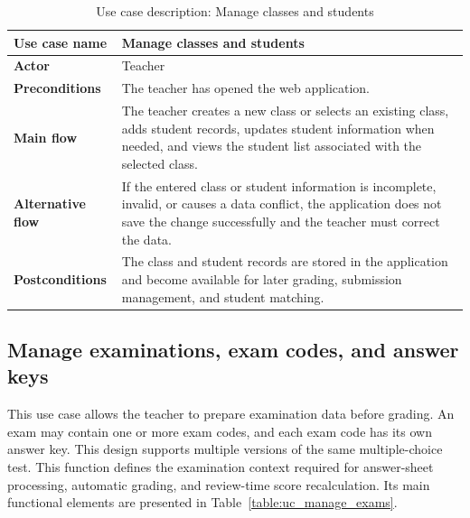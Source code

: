 \documentclass[../Main.tex]{subfiles}
\begin{document}
\begin{table}[H]
    \centering
    \caption{Use case description: Manage classes and students}
    \label{table:uc_manage_students}
    \renewcommand{\arraystretch}{1.25}
    \begin{tabular}{|p{}|p{}|}
        \hline
        \textbf{Use case name} & Manage classes and students \\
        \hline
        \textbf{Actor} & Teacher \\
        \hline
        \textbf{Preconditions} & The teacher has opened the web application. \\
        \hline
        \textbf{Main flow} & The teacher creates a new class or selects an existing class, adds student records, updates student information when needed, and views the student list associated with the selected class. \\
        \hline
        \textbf{Alternative flow} & If the entered class or student information is incomplete, invalid, or causes a data conflict, the application does not save the change successfully and the teacher must correct the data. \\
        \hline
        \textbf{Postconditions} & The class and student records are stored in the application and become available for later grading, submission management, and student matching. \\
        \hline
    \end{tabular}
\end{table}

\subsection{Manage examinations, exam codes, and answer keys}
\label{subsection:2.3.2}

This use case allows the teacher to prepare examination data before grading. An
exam may contain one or more exam codes, and each exam code has its own answer
key. This design supports multiple versions of the same multiple-choice test.
This function defines the examination context required for answer-sheet
processing, automatic grading, and review-time score recalculation. Its main
functional elements are presented in Table~\ref{table:uc_manage_exams}.
\end{document}
